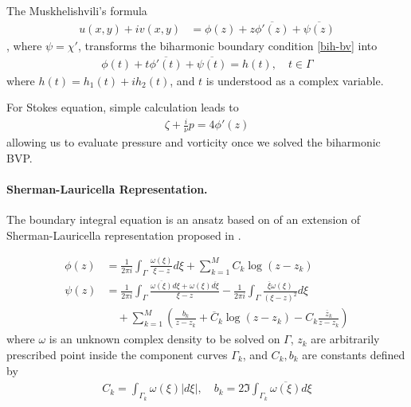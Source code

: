 \documentclass[10pt,twocolumn]{article}
\newtheorem[L]{thm}{Theorem}[section]
\begin{document}
The Muskhelishvili's formula
\begin{align}
    u(x,y) + iv(x,y) 
    &= \phi(z) + z \overline{\phi'(z)} + \overline{\psi(z)}
    \label{muskhelishvili}
\end{align}, where $\psi = \chi'$,  transforms the biharmonic boundary condition \eqref{bih-bv} into 
\begin{align}
  \phi(t) + t\overline{\phi'(t)} + \overline{\psi(t)} 
  = h(t), \quad
  t \in \Gamma
\end{align} where $h(t) =  h_1(t) + ih_2(t)$,  and $t$ is understood as a complex variable. 

For Stokes equation, simple calculation leads to
\begin{align}
  \zeta + \frac{i}{\nu}p = 4\phi'(z) \label{pressure-and-vorticity}
\end{align}allowing us to evaluate pressure and vorticity once we solved the biharmonic BVP.

\paragraph*{Sherman-Lauricella Representation.} The boundary integral equation is an ansatz 
based on of an extension of Sherman-Lauricella representation 
proposed in \cite{greengardIntegralEquationMethods1996}.

\begin{align}
  \phi(z) &=
    \frac {1}{2\pi i} \int_\Gamma \frac{\omega(\xi)}{\xi - z} d\xi  
    + \sum_{k=1}^M C_k \log (z-z_k)
    \\
  \psi(z) &=
    \frac {1}{2\pi i} \int_\Gamma \frac{\overline{\omega(\xi)}d\xi +  \omega(\xi)\overline{d\xi}}{\xi - z}  
    - \frac {1}{2\pi i} \int_\Gamma \frac{\overline{\xi} \omega(\xi)}{(\xi - z)^2} d\xi  
    \\
    & \quad + \sum _{k=1}^M 
    \left( \frac{b_k}{z-z_k} + \overline C_k \log (z-z_k) -  C_k \frac{\overline z_k}{z-z_k} \right) \nonumber 
\end{align}
where $\omega$ is an unknown complex density to be solved on $\Gamma$, 
$z_k$ are arbitrarily prescribed point inside the component curves $\Gamma_k$, 
and $C_k, b_k$ are constants defined by 
\begin{align}
  C_k = \int_{\Gamma_k} \omega(\xi) |d\xi|, \quad b_k = 2 \Im\int_{\Gamma_k} \overline{\omega(\xi)} {d\xi}
\end{align}
\end{document}
